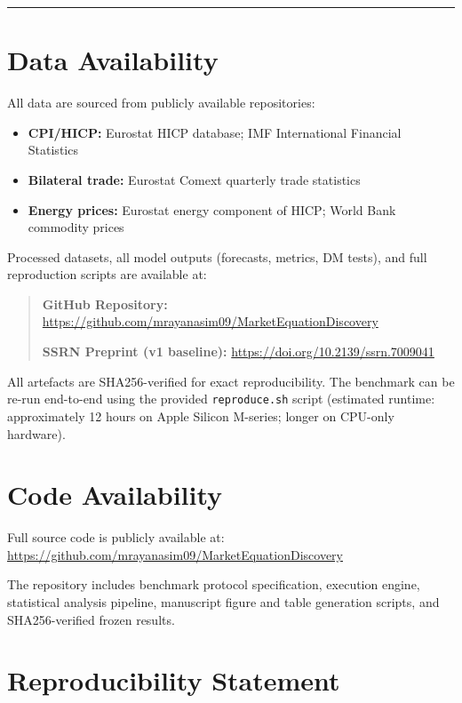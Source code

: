 \documentclass[
]{article}
\providecommand{\tightlist}{%
  \setlength{\itemsep}{0pt}\setlength{\parskip}{0pt}}
\begin{document}
\begin{center}\rule{0.5\linewidth}{0.5pt}\end{center}

\section{Data Availability}\label{data-availability}

All data are sourced from publicly available repositories:

\begin{itemize}
\tightlist
\item
  \textbf{CPI/HICP:} Eurostat HICP database; IMF International Financial
  Statistics
\item
  \textbf{Bilateral trade:} Eurostat Comext quarterly trade statistics
\item
  \textbf{Energy prices:} Eurostat energy component of HICP; World Bank
  commodity prices
\end{itemize}

Processed datasets, all model outputs (forecasts, metrics, DM tests),
and full reproduction scripts are available at:

\begin{quote}
\textbf{GitHub Repository:}
\url{https://github.com/mrayanasim09/MarketEquationDiscovery}

\textbf{SSRN Preprint (v1 baseline):}
\url{https://doi.org/10.2139/ssrn.7009041}
\end{quote}

All artefacts are SHA256-verified for exact reproducibility. The
benchmark can be re-run end-to-end using the provided
\texttt{reproduce.sh} script (estimated runtime: approximately 12 hours
on Apple Silicon M-series; longer on CPU-only hardware).

\section{Code Availability}\label{code-availability}

Full source code is publicly available at:
\url{https://github.com/mrayanasim09/MarketEquationDiscovery}

The repository includes benchmark protocol specification, execution
engine, statistical analysis pipeline, manuscript figure and table
generation scripts, and SHA256-verified frozen results.

\section*{Reproducibility Statement}\label{reproducibility-statement}
\end{document}

